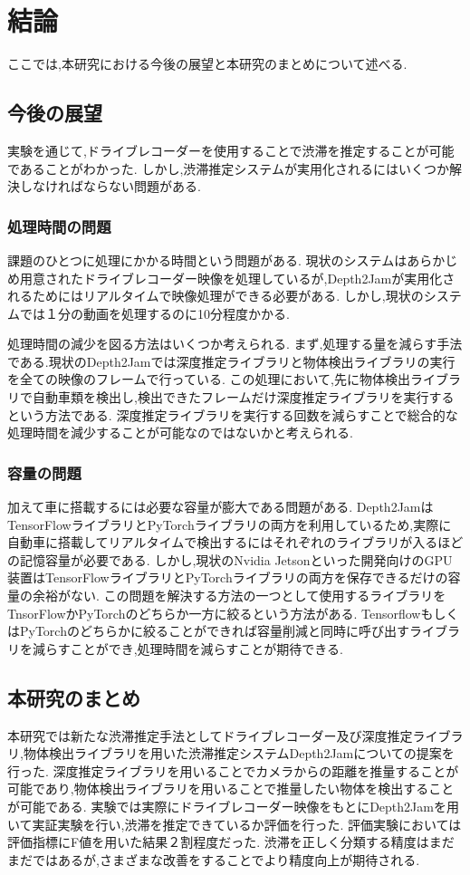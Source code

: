 \chapter{結論}
ここでは,本研究における今後の展望と本研究のまとめについて述べる.
\section{今後の展望}
実験を通じて,ドライブレコーダーを使用することで渋滞を推定することが可能であることがわかった.
しかし,渋滞推定システムが実用化されるにはいくつか解決しなければならない問題がある.
\subsection{処理時間の問題}
課題のひとつに処理にかかる時間という問題がある.
現状のシステムはあらかじめ用意されたドライブレコーダー映像を処理しているが,Depth2Jamが実用化されるためにはリアルタイムで映像処理ができる必要がある.
しかし,現状のシステムでは１分の動画を処理するのに10分程度かかる.

処理時間の減少を図る方法はいくつか考えられる.
まず,処理する量を減らす手法である.現状のDepth2Jamでは深度推定ライブラリと物体検出ライブラリの実行を全ての映像のフレームで行っている.
この処理において,先に物体検出ライブラリで自動車類を検出し,検出できたフレームだけ深度推定ライブラリを実行するという方法である.
深度推定ライブラリを実行する回数を減らすことで総合的な処理時間を減少することが可能なのではないかと考えられる.

\subsection{容量の問題}
加えて車に搭載するには必要な容量が膨大である問題がある.
Depth2JamはTensorFlowライブラリとPyTorchライブラリの両方を利用しているため,実際に自動車に搭載してリアルタイムで検出するにはそれぞれのライブラリが入るほどの記憶容量が必要である.
しかし,現状のNvidia Jetsonといった開発向けのGPU装置はTensorFlowライブラリとPyTorchライブラリの両方を保存できるだけの容量の余裕がない.
この問題を解決する方法の一つとして使用するライブラリをTnsorFlowかPyTorchのどちらか一方に絞るという方法がある.
TensorflowもしくはPyTorchのどちらかに絞ることができれば容量削減と同時に呼び出すライブラリを減らすことができ,処理時間を減らすことが期待できる.


\section{本研究のまとめ}
本研究では新たな渋滞推定手法としてドライブレコーダー及び深度推定ライブラリ,物体検出ライブラリを用いた渋滞推定システムDepth2Jamについての提案を行った.
深度推定ライブラリを用いることでカメラからの距離を推量することが可能であり,物体検出ライブラリを用いることで推量したい物体を検出することが可能である.
実験では実際にドライブレコーダー映像をもとにDepth2Jamを用いて実証実験を行い,渋滞を推定できているか評価を行った.
評価実験においては評価指標にF値を用いた結果２割程度だった.
渋滞を正しく分類する精度はまだまだではあるが,さまざまな改善をすることでより精度向上が期待される.
